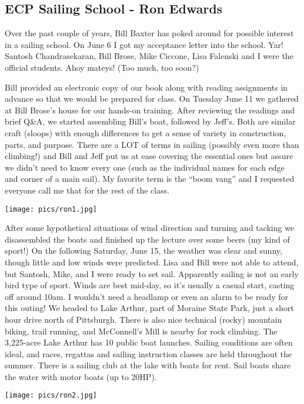 \documentclass[10pt,a4paper]{article}
\newcommand\subsect[1]{%
  \subsection*{#1}%
  \addcontentsline{toc}{subsection}{#1}}
\newenvironment{Figure}
  {\par\medskip\noindent\minipage{\linewidth}}
  {\endminipage\par\medskip}
\begin{document}
\begin{multicols}{2}
\subsect{ECP Sailing School - Ron Edwards}

Over the past couple of years, Bill Baxter has poked around for possible interest in a sailing school.  
On June 6 I got my acceptance letter into the school.  Yar!
Santosh Chandrasekaran, Bill Brose, Mike Ciccone, Lisa Falenski and I were the official students.  Ahoy mateys!  (Too much, too soon?)

Bill provided an electronic copy of our book along with reading assignments in advance so that we would be prepared for class.  On Tuesday June 11 we gathered at Bill Brose’s house for our hands-on training.  After reviewing the readings and brief Q\&A, we started assembling Bill’s boat, followed by Jeff’s.  Both are similar craft (sloops) with enough differences to get a sense of variety in construction, parts, and purpose.  There are a LOT of terms in sailing (possibly even more than climbing!) and Bill and Jeff put us at ease covering the essential ones but assure we didn’t need to know every one (such as the individual names for each edge and corner of a main sail).  My favorite term is the “boom vang” and I requested everyone call me that for the rest of the class.
\begin{Figure}
 \centering
 \texttt{[image: pics/ron1.jpg]}
\end{Figure}


After some hypothetical situations of wind direction and turning and tacking we disassembled the boats and finished up the lecture over some beers (my kind of sport!)
On the following Saturday, June 15, the weather was clear and sunny, though little and low winds were predicted.  Lisa and Bill were not able to attend, but Santosh, Mike, and I were ready to set sail.  Apparently sailing is not an early bird type of sport.  Winds are best mid-day, so it’s usually a casual start, casting off around 10am.  I wouldn’t need a headlamp or even an alarm to be ready for this outing!
We headed to Lake Arthur, part of Moraine State Park, just a short hour drive north of Pittsburgh. There is also nice technical (rocky) mountain biking, trail running, and McConnell’s Mill is nearby for rock climbing.  The 3,225-acre Lake Arthur has 10 public boat launches. Sailing conditions are often ideal, and races, regattas and sailing instruction classes are held throughout the summer.  There is a sailing club at the lake with boats for rent.  Sail boats share the water with motor boats (up to 20HP).
\begin{Figure}
 \centering
 \texttt{[image: pics/ron2.jpg]}
\end{Figure}



\end{multicols}
\end{document}
